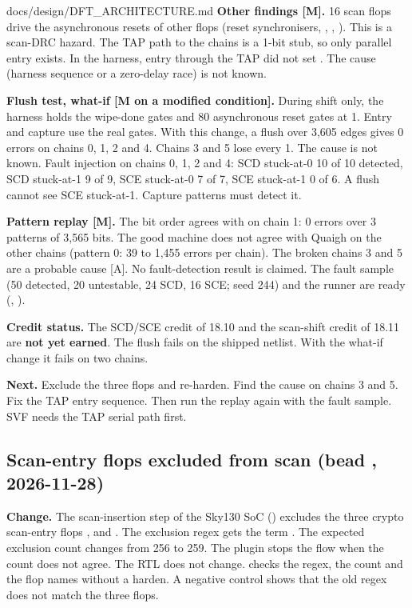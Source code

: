\begin{relocated}{docs/design/DFT_ARCHITECTURE.md}
\textbf{Other findings {[}M{]}.} 16 scan flops drive the asynchronous
resets of other flops (reset synchronisers, ,
, ). This is a scan-DRC hazard.
The TAP path to the chains is a 1-bit stub, so only parallel entry
exists. In the harness, entry through the TAP did not set
. The cause (harness sequence or a zero-delay race)
is not known.

\textbf{Flush test, what-if {[}M on a modified condition{]}.} During
shift only, the harness holds the wipe-done gates and 80 asynchronous
reset gates at 1. Entry and capture use the real gates. With this
change, a  flush over 3,605 edges gives 0 errors on chains
0, 1, 2 and 4. Chains 3 and 5 lose every 1. The cause is not known.
Fault injection on chains 0, 1, 2 and 4: SCD stuck-at-0 10 of 10
detected, SCD stuck-at-1 9 of 9, SCE stuck-at-0 7 of 7, SCE stuck-at-1
0 of 6. A flush cannot see SCE stuck-at-1. Capture patterns must detect
it.

\textbf{Pattern replay {[}M{]}.} The bit order agrees with
 on chain 1: 0 errors over 3 patterns of 3,565
bits. The good machine does not agree with Quaigh on the other chains
(pattern 0: 39 to 1,455 errors per chain). The broken chains 3 and 5
are a probable cause {[}A{]}. No fault-detection result is claimed. The
fault sample (50 detected, 20 untestable, 24 SCD, 16 SCE; seed 244) and
the runner are ready (,
).

\textbf{Credit status.} The SCD/SCE credit of 18.10 and the scan-shift
credit of 18.11 are \textbf{not yet earned}. The flush fails on the
shipped netlist. With the what-if change it fails on two chains.

\textbf{Next.} Exclude the three flops and re-harden. Find the cause on
chains 3 and 5. Fix the TAP entry sequence. Then run the replay again
with the fault sample. SVF needs the TAP serial path first.

\subsection{Scan-entry flops excluded from scan (bead ,
2026-11-28)}\label{tm:ch:dft-architecture:1813-scan-entry-exclude}

\textbf{Change.} The scan-insertion step of the Sky130 SoC
() excludes the three crypto
scan-entry flops ,  and
. The exclusion regex gets the term
. The expected exclusion count changes from 256
to 259. The plugin stops the flow when the count does not agree. The RTL
does not change.  checks the regex,
the count and the flop names without a harden. A negative control shows
that the old regex does not match the three flops.


\end{relocated}
